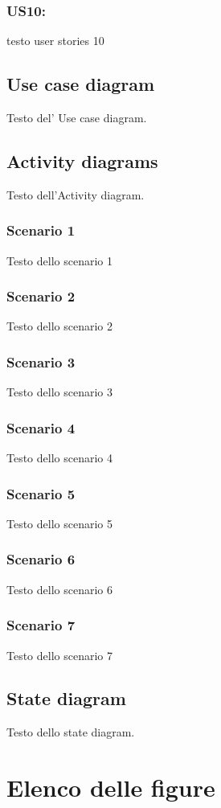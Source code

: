 \documentclass[12pt]{article}
\begin{document}
\subsubsection{US10:}
testo user stories 10



\subsection{Use case diagram}
Testo del' Use case diagram.

\subsection{Activity diagrams}
Testo dell'Activity diagram.
\subsubsection{Scenario 1}
Testo dello scenario 1
\subsubsection{Scenario 2}
Testo dello scenario 2
\subsubsection{Scenario 3}
Testo dello scenario 3
\subsubsection{Scenario 4}
Testo dello scenario 4
\subsubsection{Scenario 5}
Testo dello scenario 5
\subsubsection{Scenario 6}
Testo dello scenario 6
\subsubsection{Scenario 7}
Testo dello scenario 7

\subsection{State diagram}
Testo dello state diagram.

\section*{Elenco delle figure}
\end{document}
